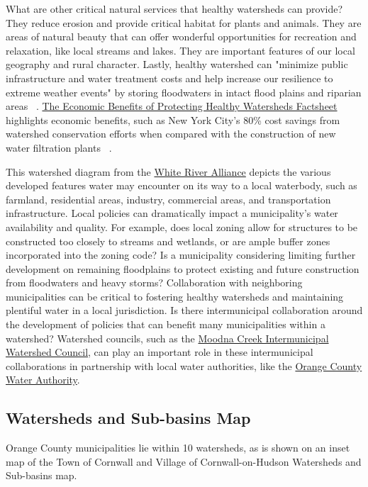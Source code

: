 What are other critical natural services that healthy watersheds can provide? 
They reduce erosion and provide critical habitat for plants and animals. They 
are areas of natural beauty that can offer wonderful opportunities for 
recreation and relaxation, like local streams and lakes. They are important 
features of our local geography and rural character. Lastly, healthy watershed 
can "minimize public infrastructure and water treatment costs and help increase 
our resilience to extreme weather events" by storing floodwaters in intact 
flood plains and riparian areas ~\citep{haeckel2014}. 
\href{
https://www.epa.gov/sites/production/files/2015-10/documents/economic\_benefits\_f
actsheet3.pdf}{The Economic Benefits of Protecting Healthy Watersheds 
Factsheet} highlights economic benefits, such as New York City’s 80\% cost 
savings from watershed conservation efforts when compared with the construction 
of new water filtration plants ~\citep{usepa2012}.
\par
This watershed diagram from the \href{https://thewhiteriveralliance.org/}{White 
River Alliance} depicts the various developed features water may encounter on 
its way to a local waterbody, such as farmland, residential areas, industry, 
commercial areas, and transportation infrastructure. Local policies can 
dramatically impact a municipality's water availability and quality. For 
example, does local zoning allow for structures to be constructed too closely to 
streams and wetlands, or are ample buffer zones incorporated into the zoning 
code? Is a municipality considering limiting further development on remaining 
floodplains to protect existing and future construction from floodwaters and 
heavy storms? Collaboration with neighboring municipalities can be critical to 
fostering healthy watersheds and maintaining plentiful water in a local 
jurisdiction. Is there intermunicipal collaboration around the development of 
policies that can benefit many municipalities within a watershed? Watershed 
councils, such as the 
\href{http://waterauthority.orangecountygov.com/moodna\_council.html}{Moodna 
Creek Intermunicipal Watershed Council}, can play an important role in these 
intermunicipal collaborations in partnership with local water authorities, like 
the \href{http://waterauthority.orangecountygov.com/index.html}{Orange County 
Water Authority}.
\subsection*{Watersheds and Sub-basins Map}
Orange County municipalities lie within 10 watersheds, as is shown on an inset 
map of the Town of Cornwall and Village of Cornwall-on-Hudson Watersheds and 
Sub-basins map.

